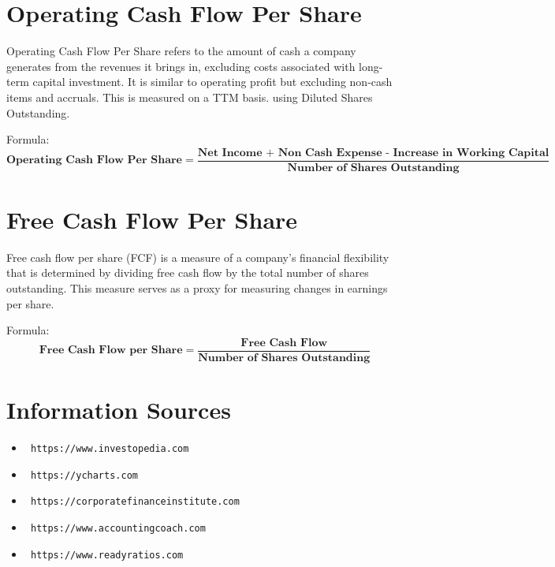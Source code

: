 \documentclass{article}
\begin{document}
\section{Operating Cash Flow Per Share}
\label{sec:ocfps}
Operating Cash Flow Per Share refers to the amount of cash a company generates from the revenues it brings in, excluding costs associated with long-term capital investment. It is similar to operating profit but excluding non-cash items and accruals. This is measured on a TTM basis. using Diluted Shares Outstanding.
\par
\bigskip
Formula:
$$
\textbf{Operating Cash Flow Per Share} =  \frac{\textbf{Net Income + Non Cash Expense - Increase in Working Capital
}}{\textbf{Number of Shares Outstanding}}
$$

\section{Free Cash Flow Per Share}
\label{sec:fcfps}
Free cash flow per share (FCF) is a measure of a company's financial flexibility that is determined by dividing free cash flow by the total number of shares outstanding. This measure serves as a proxy for measuring changes in earnings per share. 
\par
\bigskip
Formula:
$$
\textbf{Free Cash Flow per Share} =  \frac{\textbf{Free Cash Flow
}}{\textbf{Number of Shares Outstanding}}
$$

\appendix

\section{Information Sources}

\begin{itemize}
    
    \item \texttt{ https://www.investopedia.com}
    \item \texttt{ https://ycharts.com}
    \item \texttt{ https://corporatefinanceinstitute.com}
	\item \texttt{ https://www.accountingcoach.com}
    \item \texttt{ https://www.readyratios.com}
    
\end{itemize}
\end{document}

